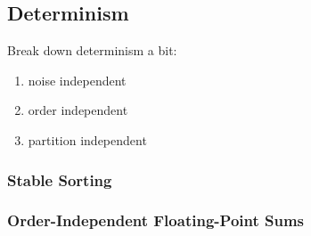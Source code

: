 \subsection{Determinism}

Break down determinism a bit:
\begin{enumerate}
\item noise independent
\item order independent
\item partition independent
\end{enumerate}

\subsubsection{Stable Sorting}

\subsubsection{Order-Independent Floating-Point Sums}

